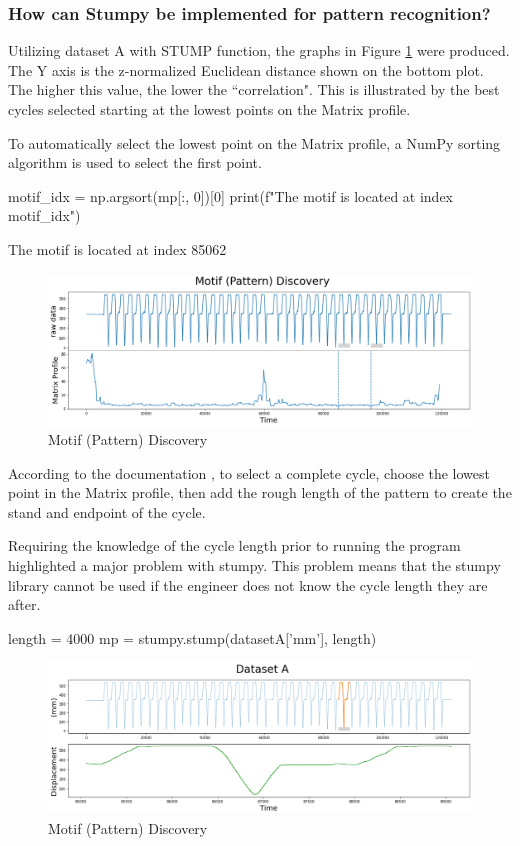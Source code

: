 \subsubsection{How can Stumpy be implemented for pattern recognition?}
Utilizing dataset A with STUMP function, the graphs in Figure \ref{Motif} were produced.
The Y axis is the z-normalized Euclidean distance shown on the bottom plot. The higher this value, the lower the ``correlation". This is illustrated by the best cycles selected starting at the lowest points on the Matrix profile.

To automatically select the lowest point on the Matrix profile, a NumPy sorting algorithm is used to select the first point.

\begin{python}
motif_idx = np.argsort(mp[:, 0])[0]
print(f"The motif is located at index {motif_idx}")
\end{python}
The motif is located at index 85062

\begin{figure}
\centering
\includegraphics[scale=0.40]{images/Motif (Pattern) Discovery.png}
\caption{Motif (Pattern) Discovery}
\label{Motif}
\end{figure}
According to the documentation \cite{law2019stumpy}, to select a complete cycle, choose the lowest point in the Matrix profile, then add the rough length of the pattern to create the stand and endpoint of the cycle.

Requiring the knowledge of the cycle length prior to running the program highlighted a major problem with stumpy. This problem means that the stumpy library cannot be used if the engineer does not know the cycle length they are after. 
\begin{python}
length = 4000
mp = stumpy.stump(datasetA['mm'], length)

\end{python}

\begin{figure}
\centering
\includegraphics[scale=0.40]{images/DatasetA.png}
\caption{Motif (Pattern) Discovery}
\label{Stumpy Cycle selected}
\end{figure}


